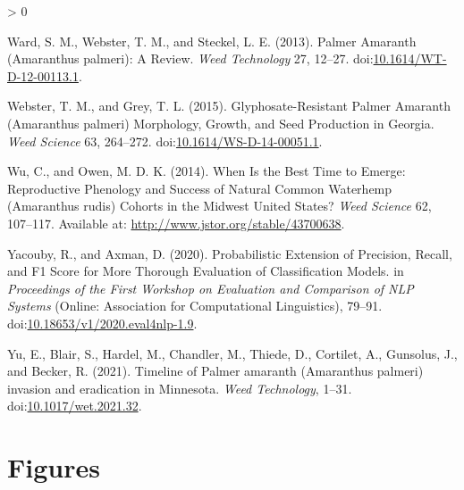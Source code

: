 \documentclass[utf8]{frontiersSCNS}
\newlength{\cslhangindent}
\newenvironment{CSLReferences}[2] %
 {%
  \setlength{\parindent}{0pt}
  \ifodd #1 \everypar{\setlength{\hangindent}{\cslhangindent}}\ignorespaces\fi
  \ifnum #2 > 0
  \setlength{\parskip}{#2\baselineskip}
  \fi
 }%
 {}
\begin{document}
\begin{CSLReferences}{1}{0}
\leavevmode\hypertarget{ref-ward2013}{}%
Ward, S. M., Webster, T. M., and Steckel, L. E. (2013). Palmer
{Amaranth} ({Amaranthus} palmeri): {A Review}. \emph{Weed Technology}
27, 12--27.
doi:\href{https://doi.org/10.1614/WT-D-12-00113.1}{10.1614/WT-D-12-00113.1}.

\leavevmode\hypertarget{ref-webster2015}{}%
Webster, T. M., and Grey, T. L. (2015). Glyphosate-{Resistant Palmer
Amaranth} ({Amaranthus} palmeri) {Morphology}, {Growth}, and {Seed
Production} in {Georgia}. \emph{Weed Science} 63, 264--272.
doi:\href{https://doi.org/10.1614/WS-D-14-00051.1}{10.1614/WS-D-14-00051.1}.

\leavevmode\hypertarget{ref-wu2014}{}%
Wu, C., and Owen, M. D. K. (2014). When {Is} the {Best Time} to
{Emerge}: {Reproductive Phenology} and {Success} of {Natural Common
Waterhemp} ({Amaranthus} rudis) {Cohorts} in the {Midwest United
States}? \emph{Weed Science} 62, 107--117. Available at:
\url{http://www.jstor.org/stable/43700638}.

\leavevmode\hypertarget{ref-yacouby2020}{}%
Yacouby, R., and Axman, D. (2020). Probabilistic {Extension} of
{Precision}, {Recall}, and {F1 Score} for {More Thorough Evaluation} of
{Classification Models}. in \emph{Proceedings of the {First Workshop} on
{Evaluation} and {Comparison} of {NLP Systems}} ({Online}: {Association
for Computational Linguistics}), 79--91.
doi:\href{https://doi.org/10.18653/v1/2020.eval4nlp-1.9}{10.18653/v1/2020.eval4nlp-1.9}.

\leavevmode\hypertarget{ref-yu2021}{}%
Yu, E., Blair, S., Hardel, M., Chandler, M., Thiede, D., Cortilet, A.,
Gunsolus, J., and Becker, R. (2021). Timeline of {Palmer} amaranth
({Amaranthus} palmeri) invasion and eradication in {Minnesota}.
\emph{Weed Technology}, 1--31.
doi:\href{https://doi.org/10.1017/wet.2021.32}{10.1017/wet.2021.32}.

\end{CSLReferences}

\newpage

\hypertarget{figures}{%
\section*{Figures}\label{figures}}
\end{document}

